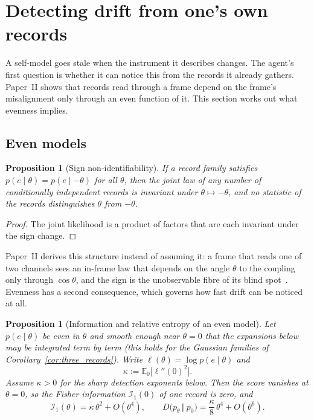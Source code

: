 \documentclass[12pt]{article}
\newtheorem{proposition}[theorem]{Proposition}
\theoremstyle{definition}
\newcommand{\E}{\mathbb E}
\begin{document}
\section{Detecting drift from one's own records}
\label{sec:detection}

A self-model goes stale when the instrument it describes changes. The agent's first question is whether it can notice this from the records it already gathers. Paper~II shows that records read through a frame depend on the frame's misalignment only through an even function of it. This section works out what evenness implies.

\subsection{Even models}
\label{subsec:first_order}

\begin{proposition}[Sign non-identifiability]
\label{prop:first_order_nonidentifiability}
If a record family satisfies $p(e\mid\theta)=p(e\mid-\theta)$ for all $\theta$, then the joint law of any number of conditionally independent records is invariant under $\theta\mapsto-\theta$, and no statistic of the records distinguishes $\theta$ from $-\theta$.
\end{proposition}

\begin{proof}
The joint likelihood is a product of factors that are each invariant under the sign change.
\end{proof}

Paper~II derives this structure instead of assuming it: a frame that reads one of two channels sees an in-frame law that depends on the angle $\theta$ to the coupling only through $\cos\theta$, and the sign is the unobservable fibre of its blind spot~\cite{Liu2026TDOME_II}. Evenness has a second consequence, which governs how fast drift can be noticed at all.

\begin{proposition}[Information and relative entropy of an even model]
\label{prop:even}
Let $p(e\mid\theta)$ be even in $\theta$ and smooth enough near $\theta=0$ that the expansions below may be integrated term by term (this holds for the Gaussian families of Corollary~\ref{cor:three_records}). Write $\ell(\theta)=\log p(e\mid\theta)$ and
\[
\kappa:=\E_0\bigl[\ell''(0)^2\bigr].
\]
Assume $\kappa>0$ for the sharp detection exponents below. Then the score vanishes at $\theta=0$, so the Fisher information $\mathcal I_1(0)$ of one record is zero, and
\begin{equation}
\label{eq:even_expansions}
\mathcal I_1(\theta)=\kappa\,\theta^2+O(\theta^4),\qquad
D\bigl(p_\theta\,\Vert\,p_0\bigr)=\frac{\kappa}{8}\,\theta^4+O(\theta^6).
\end{equation}
\end{proposition}
\end{document}
